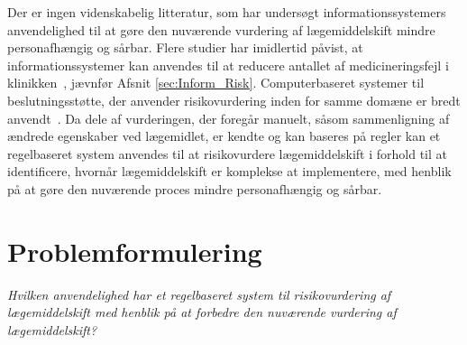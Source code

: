 Der er ingen videnskabelig litteratur, som har undersøgt informationssystemers anvendelighed til at gøre den nuværende vurdering af lægemiddelskift mindre personafhængig og sårbar. Flere studier har imidlertid påvist, at informationssystemer kan anvendes til at reducere antallet af medicineringsfejl i klinikken~\citep{Agrawal2009, Stenner2010, Fischer2008, Simpson2008}, jævnfør Afsnit \ref{sec:Inform_Risk}. Computerbaseret systemer til beslutningsstøtte, der anvender risikovurdering inden for samme domæne er bredt anvendt~\citep{Geissert2018, Rawshani2018}. Da dele af vurderingen, der foregår manuelt, såsom sammenligning af ændrede egenskaber ved lægemidlet, er kendte og kan baseres på regler kan et regelbaseret system anvendes til at risikovurdere lægemiddelskift i forhold til at identificere, hvornår lægemiddelskift er komplekse at implementere, med henblik på at gøre den nuværende proces mindre personafhængig og sårbar. 


\section{Problemformulering}
\textit{Hvilken anvendelighed har et regelbaseret system til risikovurdering af lægemiddelskift med henblik på at forbedre den nuværende vurdering af lægemiddelskift?}




